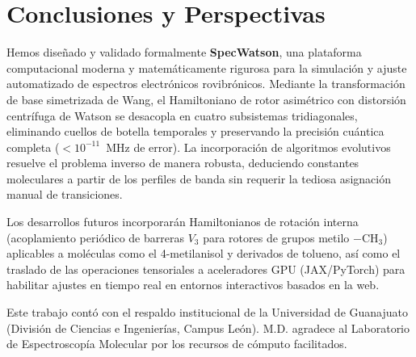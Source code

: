 \documentclass[aps,jcp,reprint,twocolumn,superscriptaddress,showpacs,amsmath,amssymb]{revtex4-2}
\begin{document}
\section{Conclusiones y Perspectivas}
Hemos dise\~nado y validado formalmente \textbf{SpecWatson}, una plataforma computacional moderna y matem\'aticamente rigurosa para la simulaci\'on y ajuste automatizado de espectros electr\'onicos rovibr\'onicos. Mediante la transformaci\'on de base simetrizada de Wang, el Hamiltoniano de rotor asim\'etrico con distorsi\'on centr\'ifuga de Watson se desacopla en cuatro subsistemas tridiagonales, eliminando cuellos de botella temporales y preservando la precisi\'on cu\'antica completa ($< 10^{-11}$~MHz de error). La incorporaci\'on de algoritmos evolutivos resuelve el problema inverso de manera robusta, deduciendo constantes moleculares a partir de los perfiles de banda sin requerir la tediosa asignaci\'on manual de transiciones.

Los desarrollos futuros incorporar\'an Hamiltonianos de rotaci\'on interna (acoplamiento peri\'odico de barreras $V_3$ para rotores de grupos metilo $-\text{CH}_3$) aplicables a mol\'eculas como el 4-metilanisol y derivados de tolueno, as\'i como el traslado de las operaciones tensoriales a aceleradores GPU (JAX/PyTorch) para habilitar ajustes en tiempo real en entornos interactivos basados en la web.

\begin{acknowledgments}
Este trabajo cont\'o con el respaldo institucional de la Universidad de Guanajuato (Divisi\'on de Ciencias e Ingenier\'ias, Campus Le\'on). M.D. agradece al Laboratorio de Espectroscop\'ia Molecular por los recursos de c\'omputo facilitados.
\end{acknowledgments}


\end{document}
